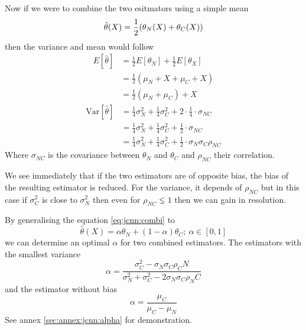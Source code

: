 \documentclass[../main.tex]{subfiles}
\begin{document}
Now if we were to combine the two esitmators using a simple mean
\begin{equation}
  \label{eq:jcnn:combi}
  \hat{\theta}(X) = \frac{1}{2} ( \theta_{N}(X) + \theta_{C}(X) ) \\
\end{equation}
then the variance and mean would follow
\begin{align}
  E[\hat{\theta}] & = \frac{1}{2}E[\theta_N] + \frac{1}{2}E[\theta_X]\\
                  & = \frac{1}{2}(\mu_N + X + \mu_C + X) \\
                  & = \frac{1}{2}(\mu_N + \mu_C) + X
\end{align}
\begin{align}
  \mathrm{Var}[\hat{\theta}] & = \frac{1}{4}\sigma^2_N + \frac{1}{4}\sigma^2_C + 2 \cdot \frac{1}{4} \cdot \sigma_{NC} \\
                             & = \frac{1}{4}\sigma^2_N + \frac{1}{4}\sigma^2_C + \frac{1}{2} \cdot \sigma_{NC} \\
                             & = \frac{1}{4}\sigma^2_N + \frac{1}{4}\sigma^2_C + \frac{1}{2} \cdot \sigma_{N} \sigma_C \rho_{NC}
\end{align}
Where $\sigma_{NC}$ is the covariance between $\theta_N$ and $\theta_C$ and $\rho_{NC}$ their correlation.

We see immediately that if the two estimators are of opposite bias, the bias of the resulting estimator is reduced. For the variance, it depends of $\rho_{NC}$ but in this case if $\sigma^2_C$ is close to $\sigma^2_N$ then even for $\rho_{NC} \lneq 1$ then we can gain in resolution.

By generalising the equation \ref{eq:jcnn:combi} to
\begin{equation}
  \hat{\theta}(X) = \alpha \theta_N + (1 - \alpha) \theta_C; ~ \alpha \in [0, 1]
\end{equation}
we can determine an optimal $\alpha$ for two combined estimators. The estimators with the smallest variance
\begin{equation}
  \alpha = \frac{\sigma_C^2 - \sigma_N \sigma_C \rho_CN}{\sigma_N^2 + \sigma_C^2 - 2\sigma_N \sigma_C \rho_NC}
\end{equation}
and the estimator without bias
\begin{equation}
  \alpha = \frac{\mu_C}{\mu_C - \mu_N}
\end{equation}
See annex \ref{sec:annex:jcnn:alpha} for demonstration.
\end{document}
